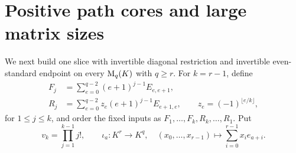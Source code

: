 \section{Positive path cores and large matrix sizes}\label{sec:large}
We next build one slice with invertible diagonal restriction and
invertible even-standard endpoint on every $\mathrm{M}_q(K)$ with $q\ge r$.
For $k=r-1$, define
\begin{equation}\label{eq:Vandermonde}
\begin{split}
 F_j&=\sum_{e=0}^{q-2}(e+1)^{j-1}E_{e,e+1},\\
 R_j&=\sum_{e=0}^{q-2}z_e(e+1)^{j-1}E_{e+1,e},
 \qquad z_e=(-1)^{\lfloor e/k\rfloor},
\end{split}
\end{equation}
for $1\le j\le k$, and order the fixed inputs as
$F_1,\ldots,F_k,R_k,\ldots,R_1$. Put
\[
 v_k=\prod_{j=1}^{k-1}j!,\qquad
 \iota_a:K^r\longrightarrow K^q,
 \quad(x_0,\ldots,x_{r-1})\longmapsto
 \sum_{i=0}^{r-1}x_i e_{a+i}.
\]

